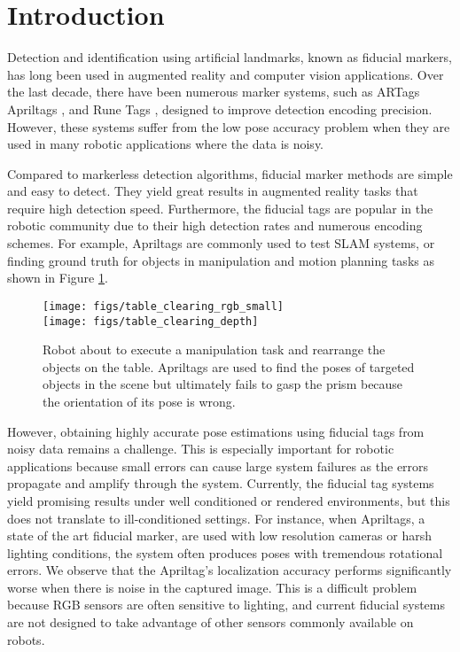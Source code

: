 \section{Introduction}
\label{sec:intro}

Detection and identification using artificial landmarks, known as fiducial markers, has long been used in augmented reality and computer vision applications. Over the last decade, there have been numerous marker systems, such as ARTags \citep{fiala2004artag} Apriltags \citep{olson2011apriltag}, and Rune Tags \citep{bergamasco2011rune}, designed to improve detection encoding precision. However, these systems suffer from the low pose accuracy problem when they are used in many robotic applications where the data is noisy.

Compared to markerless detection algorithms, fiducial marker methods are simple and easy to detect. They yield great results in augmented reality tasks that require high detection speed. Furthermore, the fiducial tags are popular in the robotic community due to their high detection rates and numerous encoding schemes. For example, Apriltags are commonly used to test SLAM systems, or finding ground truth for objects in manipulation and motion planning tasks as shown in Figure \ref{fig:table_clearing}. 

\begin{figure}
\texttt{[image: figs/table\_clearing\_rgb\_small]} \\
\texttt{[image: figs/table\_clearing\_depth]}
\caption{Robot about to execute a manipulation task and rearrange the objects on the table. Apriltags are used to find the poses of targeted objects in the scene but ultimately fails to gasp the prism because the orientation of its pose is wrong.}
\label{fig:table_clearing}
\end{figure}

However, obtaining highly accurate pose estimations using fiducial tags from noisy data remains a challenge. This is especially important for robotic applications because small errors can cause large system failures as the errors propagate and amplify through the system. Currently, the fiducial tag systems yield promising results under well conditioned or rendered environments, but this does not translate to ill-conditioned settings. For instance, when Apriltags, a state of the art fiducial marker, are used with low resolution cameras or harsh lighting conditions, the system often produces poses with tremendous rotational errors. We observe that the Apriltag's localization accuracy performs significantly worse when there is noise in the captured image. This is a difficult problem because RGB sensors are often sensitive to lighting, and current fiducial systems are not designed to take advantage of other sensors commonly available on robots.

